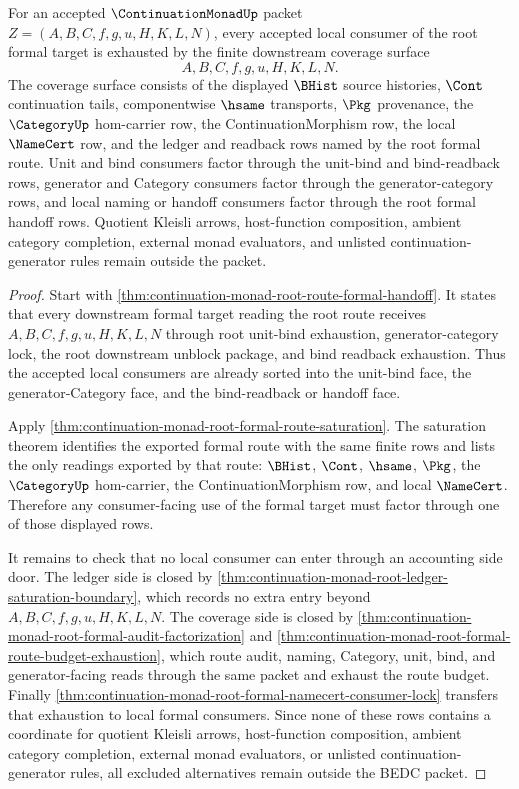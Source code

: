\begin{theorem}
\label{thm:continuation-monad-root-formal-downstream-coverage}
For an accepted $\ContinuationMonadUp$ packet $Z=(A,B,C,f,g,u,H,K,L,N)$, every accepted local consumer of the root formal target is exhausted by the finite downstream coverage surface
$$
A,B,C,f,g,u,H,K,L,N.
$$
The coverage surface consists of the displayed $\BHist$ source histories, $\Cont$ continuation tails, componentwise $\hsame$ transports, $\Pkg$ provenance, the $\CategoryUp$ hom-carrier row, the ContinuationMorphism row, the local $\NameCert$ row, and the ledger and readback rows named by the root formal route. Unit and bind consumers factor through the unit-bind and bind-readback rows, generator and Category consumers factor through the generator-category rows, and local naming or handoff consumers factor through the root formal handoff rows. Quotient Kleisli arrows, host-function composition, ambient category completion, external monad evaluators, and unlisted continuation-generator rules remain outside the packet.
\end{theorem}
\begin{proof}
Start with \autoref{thm:continuation-monad-root-route-formal-handoff}. It states that every downstream formal target reading the root route receives $A,B,C,f,g,u,H,K,L,N$ through root unit-bind exhaustion, generator-category lock, the root downstream unblock package, and bind readback exhaustion. Thus the accepted local consumers are already sorted into the unit-bind face, the generator-Category face, and the bind-readback or handoff face.

Apply \autoref{thm:continuation-monad-root-formal-route-saturation}. The saturation theorem identifies the exported formal route with the same finite rows and lists the only readings exported by that route: $\BHist$, $\Cont$, $\hsame$, $\Pkg$, the $\CategoryUp$ hom-carrier, the ContinuationMorphism row, and local $\NameCert$. Therefore any consumer-facing use of the formal target must factor through one of those displayed rows.

It remains to check that no local consumer can enter through an accounting side door. The ledger side is closed by \autoref{thm:continuation-monad-root-ledger-saturation-boundary}, which records no extra entry beyond $A,B,C,f,g,u,H,K,L,N$. The coverage side is closed by \autoref{thm:continuation-monad-root-formal-audit-factorization} and \autoref{thm:continuation-monad-root-formal-route-budget-exhaustion}, which route audit, naming, Category, unit, bind, and generator-facing reads through the same packet and exhaust the route budget. Finally \autoref{thm:continuation-monad-root-formal-namecert-consumer-lock} transfers that exhaustion to local formal consumers. Since none of these rows contains a coordinate for quotient Kleisli arrows, host-function composition, ambient category completion, external monad evaluators, or unlisted continuation-generator rules, all excluded alternatives remain outside the BEDC packet.
\end{proof}
